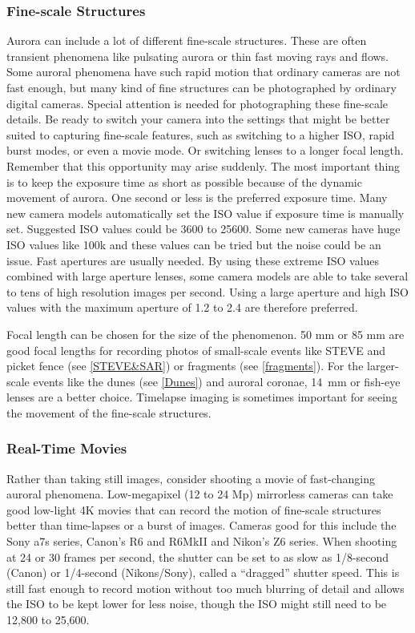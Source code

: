 \documentclass{article}
\begin{document}
\subsubsection{Fine-scale Structures}

Aurora can include a lot of different fine-scale structures. These are often transient phenomena like pulsating aurora or thin fast moving rays and flows. Some auroral phenomena have such rapid motion that ordinary cameras are not fast enough, but many kind of fine structures can be photographed by ordinary digital cameras. Special attention is needed for photographing these fine-scale details. Be ready to switch your camera into the settings that might be better suited to capturing fine-scale features, such as switching to a higher ISO, rapid burst modes, or even a movie mode. Or switching lenses to a longer focal length. Remember that this opportunity may arise suddenly. The most important thing is to keep the exposure time as short as possible because of the dynamic movement of aurora. One second or less is the preferred exposure time. Many new camera models automatically set the ISO value if exposure time is manually set. Suggested ISO values could be 3600 to 25600. Some new cameras have huge ISO values like 100k and these values can be tried but the noise could be an issue. Fast apertures are usually needed. By using these extreme ISO values combined with large aperture lenses, some camera models are able to take several to tens of high resolution images per second. Using a large aperture and high ISO values with the maximum aperture of 1.2 to 2.4 are therefore preferred. 

Focal length can be chosen for the size of the phenomenon. 50 mm or 85 mm are good focal lengths for recording photos of small-scale events like STEVE and picket fence (see \ref{STEVE&SAR}) or fragments (see \ref{fragments}). For the larger-scale events like the dunes (see \ref{Dunes}) and auroral coronae, 14~mm or fish-eye lenses are a better choice. Timelapse imaging is sometimes important for seeing the movement of the fine-scale structures.


\subsubsection{Real-Time Movies}
Rather than taking still images, consider shooting a movie of fast-changing auroral phenomena. Low-megapixel (12 to 24 Mp) mirrorless cameras can take good low-light 4K movies that can record the motion of fine-scale structures better than time-lapses or a burst of images. Cameras good for this include the Sony a7s series, Canon's R6 and R6MkII and Nikon's Z6 series. When shooting at 24 or 30 frames per second, the shutter can be set to as slow as 1/8-second (Canon) or 1/4-second (Nikons/Sony), called a ``dragged'' shutter speed. This is still fast enough to record motion without too much blurring of detail and allows the ISO to be kept lower for less noise, though the ISO might still need to be 12,800 to 25,600. 
\end{document}
